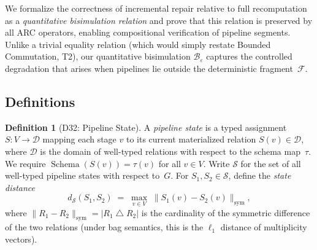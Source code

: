 \documentclass[11pt,a4paper]{article}
\theoremstyle{definition}
\newtheorem{definition}[theorem]{Definition}
\newcommand{\FragF}{\mathcal{F}}
\DeclareMathOperator{\Schema}{Schema}
\begin{document}
We formalize the correctness of incremental repair relative to full
recomputation as a \emph{quantitative bisimulation relation} and prove that
this relation is preserved by all ARC operators, enabling compositional
verification of pipeline segments.  Unlike a trivial equality relation
(which would simply restate Bounded Commutation, T2), our quantitative
bisimulation $\mathcal{B}_\varepsilon$ captures the controlled degradation
that arises when pipelines lie outside the deterministic fragment~$\FragF$.

\subsection{Definitions}

\begin{definition}[D32: Pipeline State]\label{def:pipeline-state}
A \emph{pipeline state} is a typed assignment
$S\colon V \to \mathcal{D}$ mapping each stage $v$ to its current
materialized relation $S(v) \in \mathcal{D}$, where $\mathcal{D}$ is the
domain of well-typed relations with respect to the schema map~$\tau$.
We require $\Schema(S(v)) = \tau(v)$ for all $v \in V$.
Write $\mathcal{S}$ for the set of all well-typed pipeline states
with respect to~$G$.  For $S_1, S_2 \in \mathcal{S}$, define the
\emph{state distance}
\[
  d_{\mathcal{S}}(S_1, S_2)
  \;=\; \max_{v \in V}\; \|S_1(v) - S_2(v)\|_{\mathrm{sym}},
\]
where $\|R_1 - R_2\|_{\mathrm{sym}} = |R_1 \mathbin{\triangle} R_2|$ is the
cardinality of the symmetric difference of the two relations (under bag
semantics, this is the $\ell_1$ distance of multiplicity vectors).
\end{definition}
\end{document}
